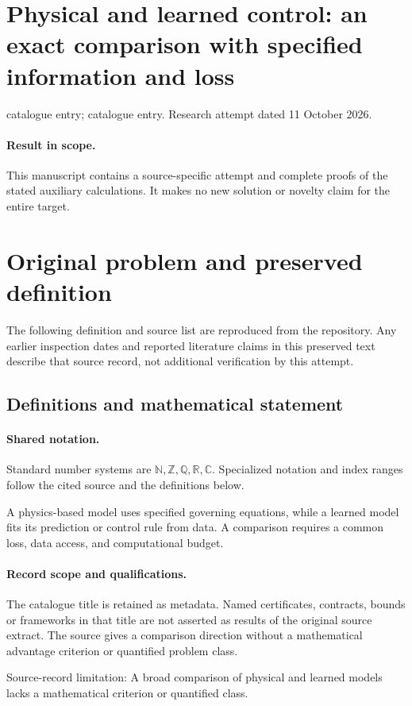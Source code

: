 \documentclass[11pt]{article}
\begin{document}
\section*{Physical and learned control: an exact comparison with specified information and loss}
\noindent catalogue entry; catalogue entry. Research attempt dated 11 October 2026.
\paragraph{Result in scope.}This manuscript contains a source-specific attempt and complete proofs of the stated auxiliary calculations. It makes no new solution or novelty claim for the entire target.
\section{Original problem and preserved definition}
The following definition and source list are reproduced from the repository. Any earlier inspection dates and reported literature claims in this preserved text describe that source record, not additional verification by this attempt.
\subsection{Definitions and mathematical statement}

\paragraph{Shared notation.}Standard number systems are $\mathbb N,\mathbb Z,\mathbb Q,\mathbb R,\mathbb C$. Specialized notation and index ranges follow the cited source and the definitions below.


A physics-based model uses specified governing equations, while a learned model fits its prediction or control rule from data. A comparison requires a common loss, data access, and computational budget.
\paragraph{Record scope and qualifications.}
The catalogue title is retained as metadata. Named certificates, contracts, bounds or frameworks in that title are not asserted as results of the original source extract.
The source gives a comparison direction without a mathematical advantage criterion or quantified problem class.

Source-record limitation: A broad comparison of physical and learned models lacks a mathematical criterion or quantified class.
\end{document}
